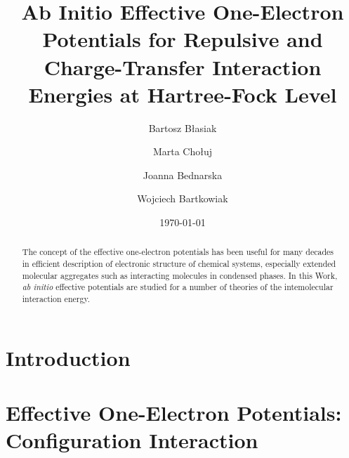 


\title{Ab Initio Effective One-Electron Potentials 
for Repulsive and Charge-Transfer Interaction Energies at Hartree-Fock Level}

\author{Bartosz B{\l}asiak}

\author{Marta Cho{\l}uj} 
\author{Joanna Bednarska}
\author{Wojciech Bartkowiak}


\date{\today}

\begin{abstract}
The concept of the effective one-electron potentials has been useful for many decades
in efficient description of electronic structure of chemical systems, especially extended
molecular aggregates such as interacting molecules in condensed phases. 
In this Work, \emph{ab initio} effective potentials are studied for a number of theories
of the intemolecular interaction energy.
\end{abstract}

\pacs{}

\maketitle

\tableofcontents

\section{\label{s:1}Introduction}
\section{\label{s:2}Effective One-Electron Potentials: Configuration Interaction}

